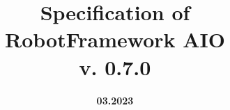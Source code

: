 
\title{\textbf{Specification of \\
\vspace{2ex}
RobotFramework AIO \\
\vspace{2ex}
v. 0.7.0}}
\date{\vspace{4ex}\textbf{03.2023}}

